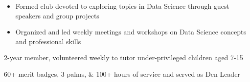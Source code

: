 \documentclass[10pt, letterpaper]{awesome-cv}
\begin{document}
\vspace*{-1ex}    
\begin{skills}
    {\vspace*{-2.5ex}
    \begin{itemize}[noitemsep, label=\bullet]
        \item Formed club devoted to exploring topics in Data Science through guest speakers and group projects
        \item Organized and led weekly meetings and workshops on Data Science concepts and professional skills
    \end{itemize}
    \vspace*{-3.5ex}}
    
    
    
    
    
    
    {2-year member, volunteered weekly to tutor under-privileged children aged 7-15}
    
    {60+ merit badges, 3 palms, \& 100+ hours of service and served as Den Leader}
\end{skills}
\end{document}
